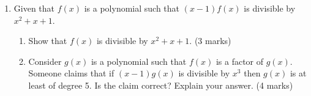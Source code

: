 \documentclass[12pt]{article}
\begin{document}
\begin{enumerate}
        \item Given that $f(x)$ is a polynomial such that $(x-1)f(x)$ is divisible by $x^2+x+1$.\begin{enumerate}
            \item Show that $f(x)$ is divisible by $x^2+x+1$. \hfill (3 marks)
            \item Consider $g(x)$ is a polynomial such that $f(x)$ is a factor of $g(x)$. Someone claims that if $(x-1)g(x)$ is divisible by $x^3$ then $g(x)$ is at least of degree 5. Is the claim correct? Explain your answer. \hfill (4 marks)
        \end{enumerate}
    \end{enumerate}
\end{document}
